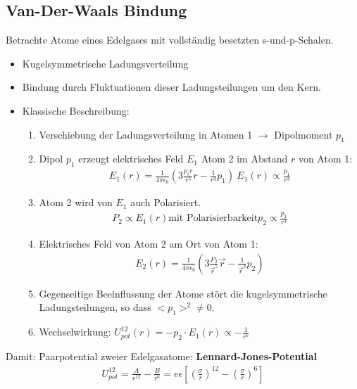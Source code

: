 \subsection{Van-Der-Waals Bindung}\label{kap:1_2}
	Betrachte Atome eines Edelgases mit vollständig besetzten s-und-p-Schalen.
	\begin{itemize}
		\item Kugelsymmetrische Ladungsverteilung
		\item Bindung durch Fluktuationen dieser Ladungsteilungen um den Kern.
		\item Klassische Beschreibung:
			\begin{enumerate}
				\item Verschiebung der Ladungsverteilung in Atomen 1 $\rightarrow$ Dipolmoment $p_1$
				\item Dipol $p_1$ erzeugt elektrisches Feld $E_1$\newline
						Atom 2 im Abstand $r$ von Atom 1:
						\begin{align}
							E_1(r)=\frac{1}{4\pi\epsilon_0}\left(3\frac{p_i r}{r^5}r-\frac{1}{r^3}p_1\right) \
							E_1(r) \propto \frac{p_1}{r^3}
						\end{align}
				\item Atom 2 wird von $E_1$ auch Polarisiert.
						\begin{align}
							P_2 \propto E_1(r) \text{mit Polarisierbarkeit}
							p_2 \propto \frac{p_1}{r^3}
						\end{align}
				\item Elektrisches Feld von Atom 2 am Ort von Atom 1:
						\begin{align*}
							E_2(r) = \frac{1}{4\pi\epsilon_0}\left(3\frac{P_2}{\vec{r}^5}\vec{r}-\frac{1}{\vec{r}^3}p_2\right)
						\end{align*}
				\item Gegenseitige Beeinflussung der Atome stört die kugelsymmetrische Ladungsteilungen, so dass $<p_1>^2 \neq 0$.
				\item Wechselwirkung: $U_{pot}^{12}(r)= -p_2\cdot E_1(r)\propto - \frac{1}{r^6}$
			\end{enumerate}
	\end{itemize}
	Damit: Paarpotential zweier Edelgasatome: \textbf{Lennard-Jones-Potential}
	\begin{align*}
		U_{pot}^{12}=\frac{A}{r^{12}}-\frac{B}{r^6} = e\epsilon\left[\left(\frac{\sigma}{r}\right)^{12} - \left(\frac{\sigma}{r}\right)^{6}\right]
	\end{align*}
